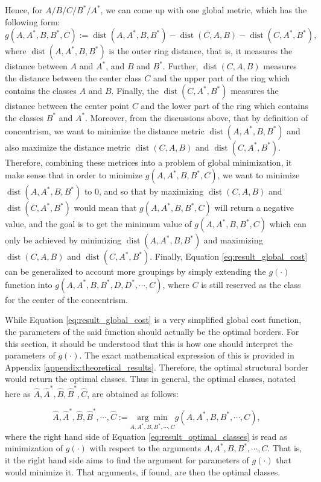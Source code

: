Hence, for $A/B/C/B^*/A^*$, we can come up with one global metric, which has the following form:
\begin{equation}\label{eq:result_global_cost}
    g(A,A^*,B,B^*,C):=\operatorname{dist}(A,A^*,B,B^*)-\operatorname{dist}(C,A,B) - \operatorname{dist}(C,A^*,B^*),
\end{equation}
where $\operatorname{dist}(A,A^*,B,B^*)$ is the outer ring distance, that is, it measures the distance between $A$ and $A^*$, and $B$ and $B^*$. Further, $\operatorname{dist}(C,A,B)$ measures the distance between the center class $C$ and the upper part of the ring which contains the classes $A$ and $B$. Finally, the $\operatorname{dist}(C,A^*,B^*)$ measures the distance between the center point $C$ and the lower part of the ring which contains the classes $B^*$ and $A^*$. Moreover, from the discussions above, that by definition of concentrism, we want to minimize the distance metric $\operatorname{dist}(A,A^*,B,B^*)$ and also maximize the distance metric $\operatorname{dist}(C,A,B)$ and $\operatorname{dist}(C,A^*,B^*)$. Therefore, combining these metrices into a problem of global minimization, it make sense that in order to minimize $g(A,A^*,B,B^*,C)$, we want to minimize $\operatorname{dist}(A,A^*,B,B^*)$ to 0, and so that by maximizing $\operatorname{dist}(C,A,B)$ and $\operatorname{dist}(C,A^*,B^*)$ would mean that $g(A,A^*,B,B^*,C)$ will return a negative value, and the goal is to get the minimum value of $g(A,A^*,B,B^*,C)$ which can only be achieved by minimizing $\operatorname{dist}(A,A^*,B,B^*)$ and maximizing $\operatorname{dist}(C,A,B)$ and $\operatorname{dist}(C,A^*,B^*)$. Finally, Equation \ref{eq:result_global_cost} can be generalized to account more groupings by simply extending the $g(\cdot)$ function into $g(A,A^*,B,B^*,D,D^*,\cdots, C)$, where $C$ is still reserved as the class for the center of the concentrism.

While Equation \ref{eq:result_global_cost} is a very simplified global cost function, the parameters of the said function should actually be the optimal borders. For this section, it should be understood that this is how one should interpret the parameters of $g(\cdot)$. The exact mathematical expression of this is provided in Appendix \ref{appendix:theoretical_results}. Therefore, the optimal structural border would return the optimal classes. Thus in general, the optimal classes, notated here as $\hat{A},\hat{A}^*,\hat{B},\hat{B}^*,\hat{C}$, are obtained as follows:

\begin{equation}\label{eq:result_optimal_classes}
    \hat{A},\hat{A}^*,\hat{B},\hat{B}^*,\cdots,\hat{C}:=\underset{A,A^{*},B,B^*,\cdots,C}{\arg\min}g(A,A^*,B,B^*,\cdots,C),
\end{equation}
where the right hand side of Equation \ref{eq:result_optimal_classes} is read as minimization of $g(\cdot)$ with respect to the arguments $A,A^*,B,B^*,\cdots,C$. That is, it the right hand side aims to find the argument for parameters of $g(\cdot)$ that would minimize it. That arguments, if found, are then the optimal classes.

